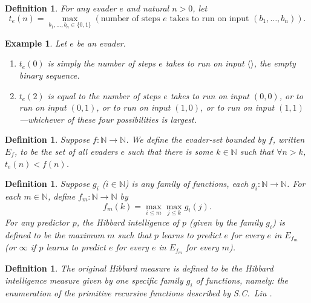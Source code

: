\documentclass{article}
\newtheorem{definition}[theorem]{Definition}
\newtheorem{example}[theorem]{Example}
\begin{document}
\begin{definition}
\label{tsubedefinition}
    For any evader $e$ and natural $n>0$,
    let
    \[
        t_e(n) = \max_{b_1,\ldots,b_n\in \{0,1\}}
        (\text{number of steps $e$ takes to run on input $(b_1,\ldots,b_n)$}).
    \]
\end{definition}

\begin{example}
Let $e$ be an evader.
\begin{enumerate}
    \item
    $t_e(0)$ is simply the number of steps $e$ takes to run on input $\langle\rangle$,
    the empty binary sequence.
    \item
    $t_e(2)$ is equal to the number of steps $e$ takes to run on input
    $(0,0)$, or to run on input $(0,1)$, or to run on input $(1,0)$, or to run on input
    $(1,1)$---whichever of these four possibilities is largest.
\end{enumerate}
\end{example}

\begin{definition}
\label{evadersetdefinition}
    Suppose $f:\mathbb N\to\mathbb N$. We define the \emph{evader-set bounded by $f$},
    written $E_f$, to be the set of all evaders $e$ such that
    there is some $k\in\mathbb N$ such that $\forall n>k$,
    $t_e(n)<f(n)$.
\end{definition}

\begin{definition}
\label{generalintelligencemeasuredefn}
    Suppose $g_i$ ($i\in \mathbb N$) is any family of functions,
    each $g_i:\mathbb N\to\mathbb N$.
    For each $m\in\mathbb N$, define $f_m:\mathbb N\to\mathbb N$ by
    \[f_m(k)=\max_{i\leq m}\max_{j\leq k}g_i(j).\]
    For any predictor $p$, the \emph{Hibbard intelligence of $p$ (given by the family $g_i$)}
    is defined to be the maximum $m$ such that
    $p$ learns to predict $e$ for every $e$ in $E_{f_m}$ (or $\infty$
    if $p$ learns to predict $e$ for every $e$ in $E_{f_m}$ for every $m$).
\end{definition}

\begin{definition}
\label{classichibbardmeasuredefn}
    The \emph{original Hibbard measure} is defined to be the Hibbard intelligence
    measure given by one specific family $g_i$ of functions, namely:
    the enumeration of the primitive recursive functions described by S.C.\ Liu
    \cite{liu1960enumeration}.
\end{definition}
\end{document}
